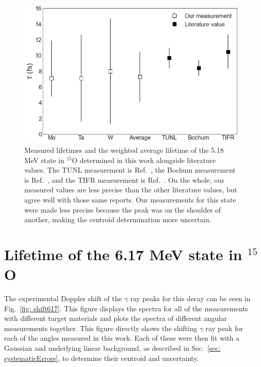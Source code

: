 \begin{figure}
\centering
\includegraphics[width=\linewidth]{figures/lifetimes518.png}
\caption{Measured lifetimes and the weighted average lifetime of the 5.18 MeV state in $^{15}$O determined in this work alongside literature values. The TUNL measurement is Ref.\ \cite{Bertone2001}, the Bochum measurement is Ref.\ \cite{Schurmann2008}, and the TIFR measurement is Ref.\ \cite{Sharma2020}. On the whole, our measured values are less precise than the other literature values, but agree well with those same reports. Our measurements for this state were made less precise because the peak was on the shoulder of another, making the centroid determination more uncertain.}
\label{fig: lifetimes518}
\end{figure}



\section{Lifetime of the 6.17 MeV state in $^{15}$O}
\label{sec: lifetime617}


The experimental Doppler shift of the $\gamma$ ray peaks for this decay can be seen in Fig.\ \ref{fig: shift617}. This figure displays the spectra for all of the measurements with different target materials and plots the spectra of different angular measurements together. This figure directly shows the shifting $\gamma$ ray peak for each of the angles measured in this work. Each of these were then fit with a Gaussian and underlying linear background, as described in Sec.\ \ref{sec: systematicErrors}, to determine their centroid and uncertainty. 


